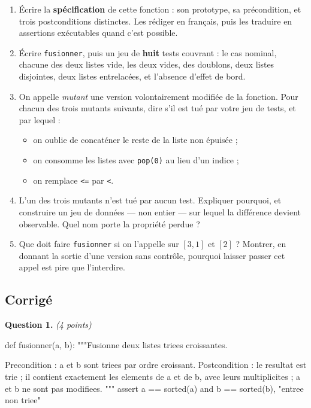 \begin{enumerate}
  \item Écrire la \textbf{spécification} de cette fonction : son prototype, sa
    précondition, et trois postconditions distinctes. Les rédiger en français,
    puis les traduire en assertions exécutables quand c'est possible.

  \item Écrire \lstinline{fusionner}, puis un jeu de \textbf{huit} tests
    couvrant : le cas nominal, chacune des deux listes vide, les deux vides,
    des doublons, deux listes disjointes, deux listes entrelacées, et l'absence
    d'effet de bord.

  \item On appelle \emph{mutant} une version volontairement modifiée de la
    fonction. Pour chacun des trois mutants suivants, dire s'il est tué par
    votre jeu de tests, et par lequel :
    \begin{itemize}
      \item on oublie de concaténer le reste de la liste non épuisée ;
      \item on consomme les listes avec \lstinline{pop(0)} au lieu d'un indice ;
      \item on remplace \lstinline{<=} par \lstinline{<}.
    \end{itemize}

  \item L'un des trois mutants n'est tué par aucun test. Expliquer pourquoi, et
    construire un jeu de données — non entier — sur lequel la différence devient
    observable. Quel nom porte la propriété perdue ?

  \item Que doit faire \lstinline{fusionner} si on l'appelle sur $[3, 1]$ et
    $[2]$ ? Montrer, en donnant la sortie d'une version sans contrôle, pourquoi
    laisser passer cet appel est pire que l'interdire.
\end{enumerate}

\subsection*{Corrigé}

\textbf{Question 1.} \emph{(4 points)}

\begin{python}
def fusionner(a, b):
    """Fusionne deux listes triees croissantes.

    Precondition  : a et b sont triees par ordre croissant.
    Postcondition : le resultat est trie ;
                    il contient exactement les elements de a et de b,
                    avec leurs multiplicites ;
                    a et b ne sont pas modifiees.
    """
    assert a == sorted(a) and b == sorted(b), "entree non triee"
\end{python}

